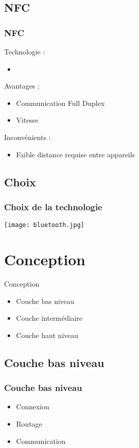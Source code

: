 \documentclass{beamer}
\begin{document}
      \subsection{NFC}
      \begin{frame}
	  \frametitle{NFC}
	  \begin{block}{Technologie :}
	  \begin{itemize}
	   \item 
	  \end{itemize}
	  \end{block}
	  \begin{block}{Avantages :}
	  \begin{itemize}
	   \item Communication Full Duplex
	   \item Vitesse
	  \end{itemize}
	  \end{block}
	  \begin{block}{Inconvénients :}
	  \begin{itemize}
	   \item Faible distance requise entre appareils
	  \end{itemize}
	  \end{block}
      \end{frame}
      \subsection{Choix}
      \begin{frame}
	  \frametitle{Choix de la technologie}
	  \begin{center}
	     \texttt{[image: bluetooth.jpg]}
      \end{center}
      \end{frame}
    \section{Conception}
    \begin{frame}{Conception}
        \begin{itemize}
            \item Couche bas niveau
            \item Couche intermédiaire
            \item Couche haut niveau
        \end{itemize}
    \end{frame}
      \subsection{Couche bas niveau}
          \begin{frame}
    	    \frametitle{Couche bas niveau}
    	    \begin{itemize}
    	        \item Connexion
    	        \item Routage
    	        \item Communication
    	    \end{itemize}
          \end{frame}
\end{document}
